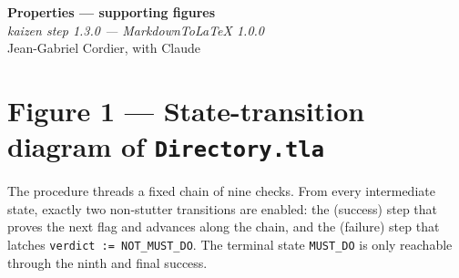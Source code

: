 \documentclass[10pt,a4paper]{article}
\begin{document}
\begin{center}
  {\Large\bfseries Properties — supporting figures}\\[2pt]
  \emph{kaizen step 1.3.0 \quad — \quad MarkdownToLaTeX 1.0.0}\\[6pt]
  Jean-Gabriel Cordier, with Claude
\end{center}

\bigskip


\section*{Figure 1 — State-transition diagram of \texttt{Directory.tla}}

The procedure threads a fixed chain of nine checks. From every
intermediate state, exactly two non-stutter transitions are enabled:
the (success) step that proves the next flag and advances along the
chain, and the (failure) step that latches \texttt{verdict := NOT\_MUST\_DO}.
The terminal state \texttt{MUST\_DO} is only reachable through the
ninth and final success.

\vspace{4pt}
\end{document}
